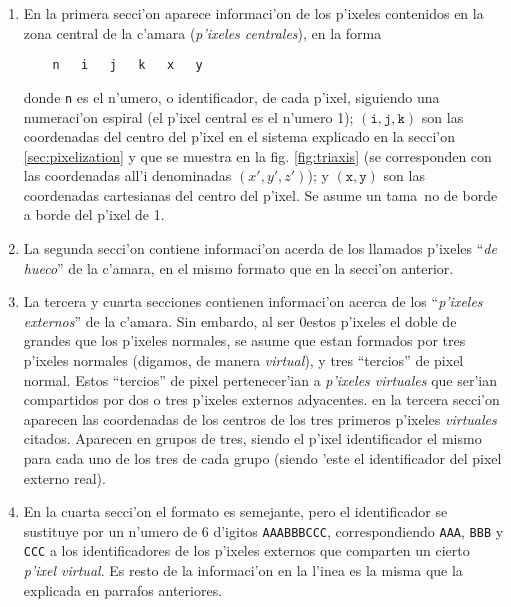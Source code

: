 \begin{enumerate}
  
\item En la primera secci'on aparece informaci'on de los p'ixeles
  contenidos en la zona central de la c'amara (\emph{p'ixeles
    centrales}), en la forma
%
\begin{verbatim}
    n   i   j   k   x   y
\end{verbatim}
%
  donde \texttt{n} es el n'umero, o identificador, de cada p'ixel,
  siguiendo una numeraci'on espiral (el p'ixel central es el n'umero
  1); $(\texttt{i},\texttt{j},\texttt{k})$ son las coordenadas del
  centro del p'ixel en el sistema explicado en la secci'on
  \ref{sec:pixelization} y que se muestra en la fig. \ref{fig:triaxis}
  (se corresponden con las coordenadas all'i denominadas
  $(x',y',z')$); y $(\texttt{x},\texttt{y})$ son las coordenadas
  cartesianas del centro del p'ixel.  Se asume un tama~no de borde a
  borde del p'ixel de 1.
  
\item La segunda secci'on contiene informaci'on acerda de los llamados
  p'ixeles ``\emph{de hueco}'' de la c'amara, en el mismo formato que
  en la secci'on anterior.
  
\item La tercera y cuarta secciones contienen informaci'on acerca de
  los ``\emph{p'ixeles externos}'' de la c'amara. Sin embardo, al ser 0estos
  p'ixeles el doble de grandes que los p'ixeles normales, se asume que
  estan formados por tres p'ixeles normales (digamos, de manera
  \emph{virtual}), y tres ``tercios'' de pixel normal. Estos
  ``tercios'' de pixel pertenecer'ian a \emph{p'ixeles virtuales} que
  ser'ian compartidos por dos o tres p'ixeles externos adyacentes.  en
  la tercera secci'on aparecen las coordenadas de los centros de los
  tres primeros p'ixeles \emph{virtuales} citados. Aparecen en grupos
  de tres, siendo el p'ixel identificador el mismo para cada uno de
  los tres de cada grupo (siendo 'este el identificador del pixel
  externo real).
  
\item En la cuarta secci'on el formato es semejante, pero el
  identificador se sustituye por un n'umero de 6 d'igitos
  \texttt{AAABBBCCC}, correspondiendo \texttt{AAA}, \texttt{BBB} y \texttt{CCC}
  a los identificadores de los p'ixeles externos que comparten un
  cierto \emph{p'ixel virtual}. Es resto de la informaci'on en la
  l'inea es la misma que la explicada en parrafos anteriores.

\end{enumerate}

